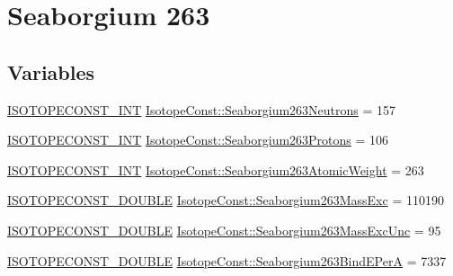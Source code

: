 \hypertarget{group___isotope_const-_seaborgium-_sg263}{}\section{Seaborgium 263}
\label{group___isotope_const-_seaborgium-_sg263}
\subsection*{Variables}
\begin{DoxyCompactItemize}
\item 
\mbox{\hyperlink{group___isotope_const-_macros_ga5f18360b3e99483a35c32d789e62621c}{I\+S\+O\+T\+O\+P\+E\+C\+O\+N\+S\+T\+\_\+\+I\+NT}} \mbox{\hyperlink{group___isotope_const-_seaborgium-_sg263_ga0b83b8768ea72e12f688ed2a7cbbc0df}{Isotope\+Const\+::\+Seaborgium263\+Neutrons}} = 157
\item 
\mbox{\hyperlink{group___isotope_const-_macros_ga5f18360b3e99483a35c32d789e62621c}{I\+S\+O\+T\+O\+P\+E\+C\+O\+N\+S\+T\+\_\+\+I\+NT}} \mbox{\hyperlink{group___isotope_const-_seaborgium-_sg263_ga3a78f7d3e12f4e81a01e1999a0203486}{Isotope\+Const\+::\+Seaborgium263\+Protons}} = 106
\item 
\mbox{\hyperlink{group___isotope_const-_macros_ga5f18360b3e99483a35c32d789e62621c}{I\+S\+O\+T\+O\+P\+E\+C\+O\+N\+S\+T\+\_\+\+I\+NT}} \mbox{\hyperlink{group___isotope_const-_seaborgium-_sg263_ga9c1d5b6e51069df540a5eea80c04abb1}{Isotope\+Const\+::\+Seaborgium263\+Atomic\+Weight}} = 263
\item 
\mbox{\hyperlink{group___isotope_const-_macros_ga8f45a7272ce02c0b4c65c44636ed719a}{I\+S\+O\+T\+O\+P\+E\+C\+O\+N\+S\+T\+\_\+\+D\+O\+U\+B\+LE}} \mbox{\hyperlink{group___isotope_const-_seaborgium-_sg263_ga1a2face47947ec38d4541226420e441a}{Isotope\+Const\+::\+Seaborgium263\+Mass\+Exc}} = 110190
\item 
\mbox{\hyperlink{group___isotope_const-_macros_ga8f45a7272ce02c0b4c65c44636ed719a}{I\+S\+O\+T\+O\+P\+E\+C\+O\+N\+S\+T\+\_\+\+D\+O\+U\+B\+LE}} \mbox{\hyperlink{group___isotope_const-_seaborgium-_sg263_ga375473c7c0da47076f04ac2f1ca7677d}{Isotope\+Const\+::\+Seaborgium263\+Mass\+Exc\+Unc}} = 95
\item 
\mbox{\hyperlink{group___isotope_const-_macros_ga8f45a7272ce02c0b4c65c44636ed719a}{I\+S\+O\+T\+O\+P\+E\+C\+O\+N\+S\+T\+\_\+\+D\+O\+U\+B\+LE}} \mbox{\hyperlink{group___isotope_const-_seaborgium-_sg263_ga28c1520ca684b4273b15535dd0a8e77f}{Isotope\+Const\+::\+Seaborgium263\+Bind\+E\+PerA}} = 7337
\item 

\end{DoxyCompactItemize}
